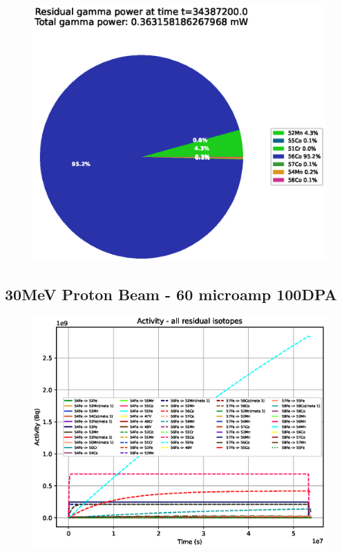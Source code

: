 \begin{figure}[!htb]
\centering
\includegraphics[width=0.7\linewidth]{chapters/activity_code/fe_100dpa/endofbeam/25MeV_0500_34387200.eps}
\caption{}
\label{fig:5mev-proton-100dpa}
\end{figure}



\clearpage
\FloatBarrier
\subsection{30MeV Proton Beam - 60 microamp 100DPA}

\begin{figure}[!htb]
\centering
\includegraphics[width=0.7\linewidth]{chapters/activity_code/fe_100dpa/by_isotope/30MeV_all_radioactive_isotopes.eps}
\caption{}
\label{fig:5mev-proton-100dpa-activity}
\end{figure}

